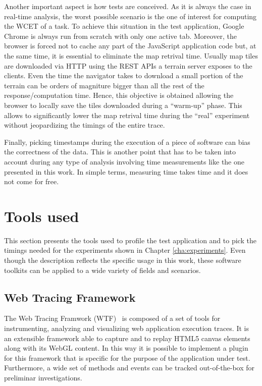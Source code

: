 Another important aspect is how tests are conceived. As it is always the case in
real-time analysis, the worst possible scenario is the one of interest for
computing the WCET of a task. To achieve this situation in the test application,
Google Chrome is always run from scratch with only one active tab. Moreover, the browser
is forced not to cache any part of the JavaScript application code but,
at the same time, it is essential to eliminate the map retrival time.
Usually map tiles are
downloaded via HTTP using the REST APIs a terrain server exposes to the clients.
Even the time the navigator takes to download a small portion of the terrain
can be orders of magniture bigger than all the rest of the response/computation time.
Hence, this objective is obtained allowing the browser to locally save the
tiles downloaded during a ``warm-up'' phase. This allows to significantly lower
the map retrival time during the ``real'' experiment without jeopardizing the
timings of the entire trace.


Finally, picking timestamps during the execution of a piece of software can bias
the correctness of the data. This is another point that has to be
taken into account during any type of analysis involving time measurements like
the one presented in this work. In simple terms, measuring time takes time and
it does not come for free.


\section{Tools used}
This section presents the tools used to profile the test application and to pick
the timings needed for the experiments shown in Chapter \ref{cha:experiments}.
Even though the description reflects the specific usage in this work, these
software toolkits can be applied to a wide variety of fields and scenarios.

\subsection{Web Tracing Framework} \label{sec:wtf}
The Web Tracing Framwork (WTF)~\cite{wtf} is composed of a set of tools for
instrumenting, analyzing and visualizing web application execution traces.
It is an extensible framework able to capture and to replay HTML5 canvas elements
along with its WebGL content. In this way it is possible to implement a plugin for
this framework that is specific for the purpose of the application under test.
Furthermore, a wide set
of methods and events can be tracked out-of-the-box for preliminar investigations.

